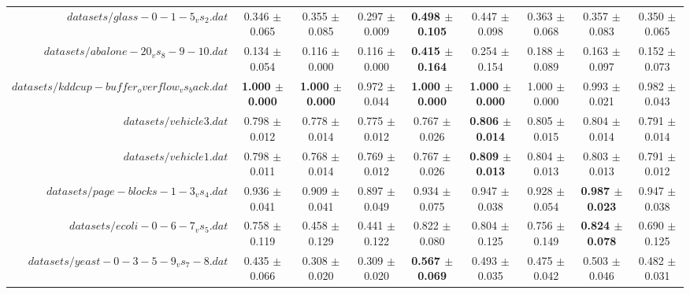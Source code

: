 \begin{table}[!ht]
{\begin{tabular}{r c c c c c c c c}
$datasets/glass-0-1-5_vs_2.dat$ & 0.346 $\pm$ 0.065 & 0.355 $\pm$ 0.085 & 0.297 $\pm$ 0.009 & \textbf{0.498 $\pm$ 0.105} & 0.447 $\pm$ 0.098 & 0.363 $\pm$ 0.068 & 0.357 $\pm$ 0.083 & 0.350 $\pm$ 0.065 \\
$datasets/abalone-20_vs_8-9-10.dat$ & 0.134 $\pm$ 0.054 & 0.116 $\pm$ 0.000 & 0.116 $\pm$ 0.000 & \textbf{0.415 $\pm$ 0.164} & 0.254 $\pm$ 0.154 & 0.188 $\pm$ 0.089 & 0.163 $\pm$ 0.097 & 0.152 $\pm$ 0.073 \\
$datasets/kddcup-buffer_overflow_vs_back.dat$ & \textbf{1.000 $\pm$ 0.000} & \textbf{1.000 $\pm$ 0.000} & 0.972 $\pm$ 0.044 & \textbf{1.000 $\pm$ 0.000} & \textbf{1.000 $\pm$ 0.000} & 1.000 $\pm$ 0.000 & 0.993 $\pm$ 0.021 & 0.982 $\pm$ 0.043 \\
$datasets/vehicle3.dat$ & 0.798 $\pm$ 0.012 & 0.778 $\pm$ 0.014 & 0.775 $\pm$ 0.012 & 0.767 $\pm$ 0.026 & \textbf{0.806 $\pm$ 0.014} & 0.805 $\pm$ 0.015 & 0.804 $\pm$ 0.014 & 0.791 $\pm$ 0.014 \\
$datasets/vehicle1.dat$ & 0.798 $\pm$ 0.011 & 0.768 $\pm$ 0.014 & 0.769 $\pm$ 0.012 & 0.767 $\pm$ 0.026 & \textbf{0.809 $\pm$ 0.013} & 0.804 $\pm$ 0.013 & 0.803 $\pm$ 0.013 & 0.791 $\pm$ 0.012 \\
$datasets/page-blocks-1-3_vs_4.dat$ & 0.936 $\pm$ 0.041 & 0.909 $\pm$ 0.041 & 0.897 $\pm$ 0.049 & 0.934 $\pm$ 0.075 & 0.947 $\pm$ 0.038 & 0.928 $\pm$ 0.054 & \textbf{0.987 $\pm$ 0.023} & 0.947 $\pm$ 0.038 \\
$datasets/ecoli-0-6-7_vs_5.dat$ & 0.758 $\pm$ 0.119 & 0.458 $\pm$ 0.129 & 0.441 $\pm$ 0.122 & 0.822 $\pm$ 0.080 & 0.804 $\pm$ 0.125 & 0.756 $\pm$ 0.149 & \textbf{0.824 $\pm$ 0.078} & 0.690 $\pm$ 0.125 \\
$datasets/yeast-0-3-5-9_vs_7-8.dat$ & 0.435 $\pm$ 0.066 & 0.308 $\pm$ 0.020 & 0.309 $\pm$ 0.020 & \textbf{0.567 $\pm$ 0.069} & 0.493 $\pm$ 0.035 & 0.475 $\pm$ 0.042 & 0.503 $\pm$ 0.046 & 0.482 $\pm$ 0.031 \\
\end{tabular}}
\end{table}
